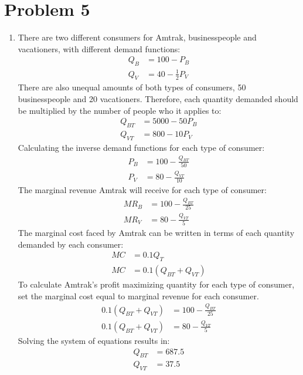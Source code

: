 \documentclass{article}
\begin{document}
\section*{Problem 5}

\begin{enumerate}
    \item There are two different consumers for Amtrak, businesspeople and
        vacationers, with different demand functions:
    \begin{align*}
        Q_{B}&=100-P_{B}\\
        Q_{V}&=40-\frac{1}{2}P_{V}
    \end{align*}
    There are also unequal amounts of both types of consumers, 50 businesspeople
    and 20 vacationers. Therefore, each quantity demanded should be multiplied
    by the number of people who it applies to:
    \begin{align*}
        Q_{BT}&=5000-50P_{B}\\
        Q_{VT}&=800-10P_{V}
    \end{align*}
    Calculating the inverse demand functions for each type of consumer:
    \begin{align*}
        P_{B}&=100-\frac{Q_{BT}}{50}\\
        P_{V}&=80-\frac{Q_{VT}}{10}
    \end{align*}
    The marginal revenue Amtrak will receive for each type of consumer:
    \begin{align*}
        MR_{B}&=100-\frac{Q_{BT}}{25}\\
        MR_{V}&=80-\frac{Q_{VT}}{5}
    \end{align*}
    The marginal cost faced by Amtrak can be written in terms of each quantity
    demanded by each consumer:
    \begin{align*}
        MC&=0.1Q_{T}\\
        MC&=0.1(Q_{BT}+Q_{VT})
    \end{align*}
    To calculate Amtrak's profit maximizing quantity for each type of consumer,
    set the marginal cost equal to marginal revenue for each consumer.
    \begin{align*}
        0.1(Q_{BT}+Q_{VT})&=100-\frac{Q_{BT}}{25}\\
        0.1(Q_{BT}+Q_{VT})&=80-\frac{Q_{VT}}{5}
    \end{align*}
    Solving the system of equations results in:
    \begin{align*}
        Q_{BT}&=687.5\\
        Q_{VT}&=37.5

\end{align*}
\end{enumerate}
\end{document}
